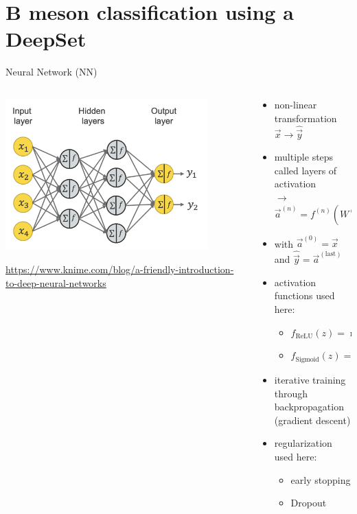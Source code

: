 \documentclass[aspectratio=1610, 10pt]{beamer}
\begin{document}
\section*{B meson classification using a DeepSet}

\begin{frame}{Neural Network (NN)}
  \begin{columns}
    \begin{column}{0.5\textwidth}
      \centering
      \includegraphics[width=0.85\textwidth]{images/NN_schematic.png}

      \tiny \url{https://www.knime.com/blog/a-friendly-introduction-to-deep-neural-networks}
    \end{column}
    \begin{column}{0.5\textwidth}
      \begin{itemize}
        \item non-linear transformation $\vec{x} \rightarrow \hat{\vec{y}}$
        \item multiple steps called layers of activation \\$\rightarrow$ $\vec{a}^{(n)} = f^{(n)}\left( W^{(n)} \cdot \vec{a}^{(n-1)} + \vec{b}^{n} \right)$
        \item with $\vec{a}^{(0)} = \vec{x}$ and $\hat{\vec{y}} = \vec{a}^{(\text{last})}$
        \item activation functions used here:
        \begin{itemize}
          \item $f_\text{ReLU}(z) = \max (0, z)$
          \item $f_\text{Sigmoid}(z) = \frac{1}{1+e^{-z}}$
        \end{itemize}
        \item iterative training through backpropagation (gradient descent)
        \item regularization used here:
        \begin{itemize}
          \item early stopping
          \item Dropout
        \end{itemize}
      \end{itemize}
    \end{column}
  \end{columns}
\end{frame}
\end{document}

